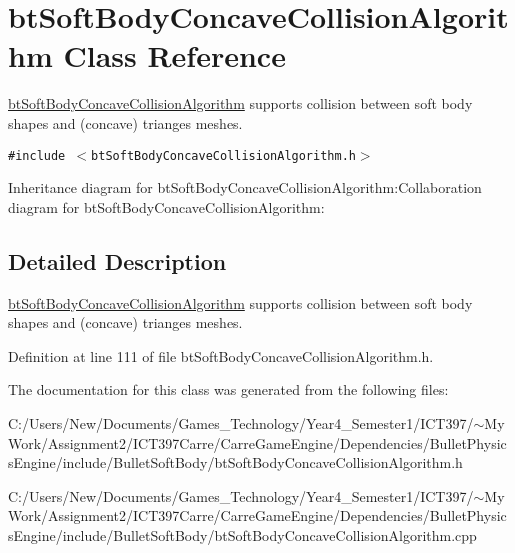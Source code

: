 \hypertarget{classbt_soft_body_concave_collision_algorithm}{
\section{btSoftBodyConcaveCollisionAlgorithm Class Reference}
\label{classbt_soft_body_concave_collision_algorithm}
}
\hyperlink{classbt_soft_body_concave_collision_algorithm}{btSoftBodyConcaveCollisionAlgorithm} supports collision between soft body shapes and (concave) trianges meshes.  


{\tt \#include $<$btSoftBodyConcaveCollisionAlgorithm.h$>$}

Inheritance diagram for btSoftBodyConcaveCollisionAlgorithm:Collaboration diagram for btSoftBodyConcaveCollisionAlgorithm:

\subsection{Detailed Description}
\hyperlink{classbt_soft_body_concave_collision_algorithm}{btSoftBodyConcaveCollisionAlgorithm} supports collision between soft body shapes and (concave) trianges meshes. 

Definition at line 111 of file btSoftBodyConcaveCollisionAlgorithm.h.

The documentation for this class was generated from the following files:\begin{CompactItemize}
\item 
C:/Users/New/Documents/Games\_\-Technology/Year4\_\-Semester1/ICT397/$\sim$My Work/Assignment2/ICT397Carre/CarreGameEngine/Dependencies/BulletPhysicsEngine/include/BulletSoftBody/btSoftBodyConcaveCollisionAlgorithm.h\item 
C:/Users/New/Documents/Games\_\-Technology/Year4\_\-Semester1/ICT397/$\sim$My Work/Assignment2/ICT397Carre/CarreGameEngine/Dependencies/BulletPhysicsEngine/include/BulletSoftBody/btSoftBodyConcaveCollisionAlgorithm.cpp\end{CompactItemize}
